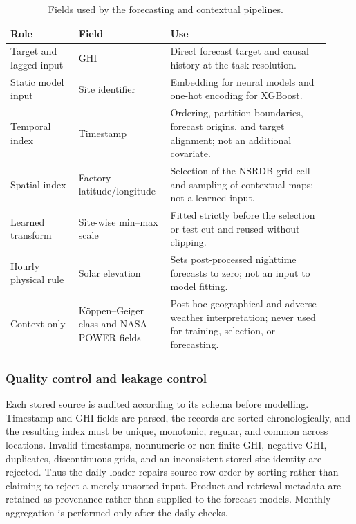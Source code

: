 \begin{table}[!t]
\centering
\caption{Fields used by the forecasting and contextual pipelines.}
\label{tab:variables}
\footnotesize
\setlength{\tabcolsep}{3pt}
\renewcommand{\arraystretch}{1.12}
\begin{tabular}{@{}
  >{\raggedright\arraybackslash}p{0.20\linewidth}
  >{\raggedright\arraybackslash}p{0.25\linewidth}
  >{\raggedright\arraybackslash}p{0.47\linewidth}@{}}
\toprule
\textbf{Role} & \textbf{Field} & \textbf{Use} \\
\midrule
Target and lagged input & GHI & Direct forecast target and causal history at
the task resolution. \\
Static model input & Site identifier & Embedding for neural models and one-hot
encoding for XGBoost. \\
Temporal index & Timestamp & Ordering, partition boundaries, forecast origins,
and target alignment; not an additional covariate. \\
Spatial index & Factory latitude/longitude & Selection of the NSRDB grid cell
and sampling of contextual maps; not a learned input. \\
Learned transform & Site-wise min--max scale & Fitted strictly before the
selection or test cut and reused without clipping. \\
Hourly physical rule & Solar elevation & Sets post-processed nighttime
forecasts to zero; not an input to model fitting. \\
Context only & K\"oppen--Geiger class and NASA POWER fields & Post-hoc
geographical and adverse-weather interpretation; never used for training,
selection, or forecasting. \\
\bottomrule
\end{tabular}
\end{table}

\subsubsection{Quality control and leakage control}

Each stored source is audited according to its schema before modelling.
Timestamp and GHI fields are parsed, the records are sorted chronologically,
and the resulting index must be unique, monotonic, regular, and common across
locations. Invalid timestamps, nonnumeric or non-finite GHI, negative GHI,
duplicates, discontinuous grids, and an inconsistent stored site identity are
rejected. Thus the daily loader repairs source row order by sorting rather than
claiming to reject a merely unsorted input. Product and retrieval metadata are
retained as provenance rather than supplied to the forecast models. Monthly
aggregation is performed only after the daily checks.

